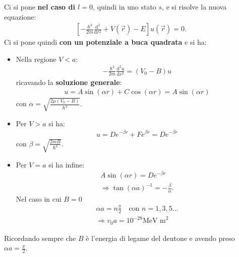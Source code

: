 \documentclass[a4paper,11pt,twoside,openany]{book}
\theoremstyle{definition}
\theoremstyle{plain}
\theoremstyle{plain}
\theoremstyle{definition}
\begin{document}
Ci si pone \textbf{nel caso di $l=0$}, quindi in uno stato $s$, e si risolve la nuova equazione:
\begin{equation}\begin{split}
\left[-\frac{\hbar ^2}{2m}\frac{\textrm{d}^2}{\textrm{d}r^2}+V\left(\vec r\right)-E\right]u\left(\vec r\right)=0.
\end{split}\end{equation}
Ci si pone quindi \textbf{con un potenziale a buca quadrata} e si ha:
\begin{itemize}
\item Nella regione $V<a$:
\begin{equation}\begin{split}
-\frac{\hbar ^2}{2m}\frac{\textrm{d}^2u}{\textrm{d}r^2}=\left(V_0-B\right)u
\end{split}\end{equation}
ricavando la \textbf{soluzione generale}:
\begin{equation}\begin{split}
u=A\sin{\left(\alpha r\right)}+C\cos{\left(\alpha r\right)}=A\sin{\left(\alpha r\right)}
\end{split}\end{equation}
con $\alpha=\sqrt{\frac{2\mu\left(V_0-B\right)}{\hbar ^2}}$.

\item Per $V>a$ si ha:
\begin{equation}\begin{split}
u=De^{-\beta r}+Fe^{\beta r}=De^{-\beta r}
\end{split}\end{equation}
con $\beta=\sqrt{\frac{2mB}{\hbar ^2}}$.

\item Per $V=a$ si ha infine:
\begin{equation}\begin{split}
A\sin{\left(\alpha r\right)}=De^{-\beta r} \\
\Longrightarrow \tan{\left(\alpha a\right)}^{-1}=-\frac{\beta}{\alpha}.
\end{split}\end{equation}
Nel caso in cui $B=0$
\begin{equation}\begin{split}
\alpha a=n\frac{\pi }{2} \quad \textrm{con } n=1,3,5\dots\\
\Longrightarrow v_0a=10^{-28} \textrm{MeV m}^2
\end{split}\end{equation}
\end{itemize}
Ricordando sempre che $B$ è l'energia di legame del deutone e avendo preso $\alpha a=\frac{\pi }{2}$.
\end{document}
